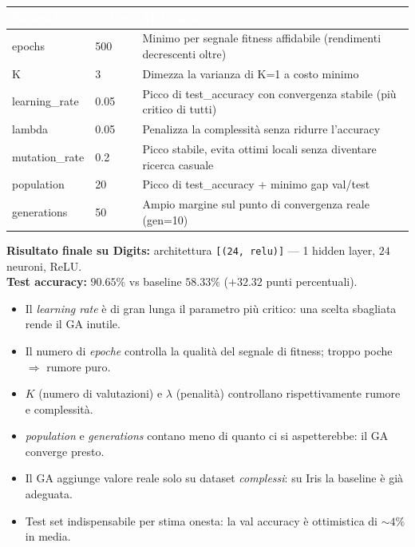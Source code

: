 \documentclass[11pt,a4paper]{article}
\begin{document}
\begin{center}
\begin{tabular}{ll>{\raggedright\arraybackslash}p{6.5cm}}
    \toprule
    \rowcolor{headerblue}
    \textcolor{white}{\textbf{Parametro}} &
    \textcolor{white}{\textbf{Valore}} &
    \textcolor{white}{\textbf{Motivazione}} \\
    \midrule
    epochs          & 500    & Minimo per segnale fitness affidabile (rendimenti decrescenti oltre)  \\
    \rowcolor{rowgray}
    K               & 3      & Dimezza la varianza di K=1 a costo minimo                            \\
    learning\_rate  & 0.05   & Picco di test\_accuracy con convergenza stabile (più critico di tutti) \\
    \rowcolor{rowgray}
    lambda          & 0.05   & Penalizza la complessità senza ridurre l'accuracy                     \\
    mutation\_rate  & 0.2    & Picco stabile, evita ottimi locali senza diventare ricerca casuale    \\
    \rowcolor{rowgray}
    population      & 20     & Picco di test\_accuracy + minimo gap val/test                         \\
    generations     & 50     & Ampio margine sul punto di convergenza reale (gen=10)                 \\
    \bottomrule
\end{tabular}
\end{center}

\textbf{Risultato finale su Digits:} architettura \texttt{[(24, relu)]} —
1 hidden layer, $24$ neuroni, ReLU. \\
\textbf{Test accuracy:} $90.65\%$ \;vs\; baseline $58.33\%$
($+32.32$ punti percentuali).

\begin{riassunto}
\begin{itemize}
    \item Il \emph{learning rate} è di gran lunga il parametro più critico: una scelta sbagliata rende il GA inutile.
    \item Il numero di \emph{epoche} controlla la qualità del segnale di fitness; troppo poche $\Rightarrow$ rumore puro.
    \item $K$ (numero di valutazioni) e $\lambda$ (penalità) controllano rispettivamente rumore e complessità.
    \item \emph{population} e \emph{generations} contano meno di quanto ci si aspetterebbe: il GA converge presto.
    \item Il GA aggiunge valore reale solo su dataset \emph{complessi}: su Iris la baseline è già adeguata.
    \item Test set indispensabile per stima onesta: la val accuracy è ottimistica di $\sim 4\%$ in media.
\end{itemize}
\end{riassunto}
\end{document}
